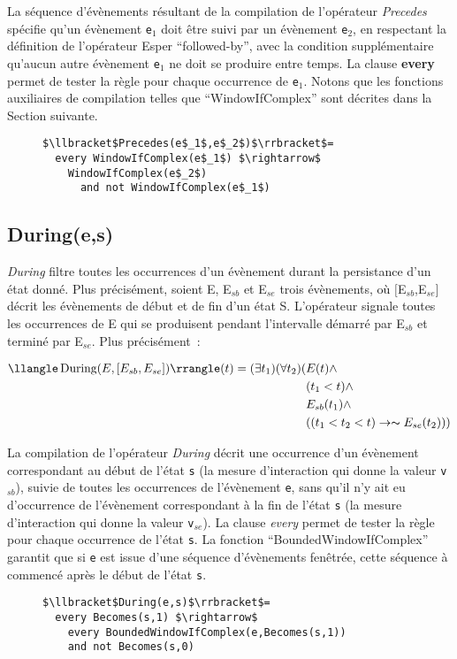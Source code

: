La séquence d'évènements résultant de la compilation de l'opérateur {\em Precedes} spécifie qu'un évènement {\tt e$_1$} doit être suivi par un évènement {\tt e$_2$}, en respectant la définition de l'opérateur Esper ``followed-by'', avec la condition supplémentaire qu'aucun autre évènement {\tt e$_1$} ne doit se produire entre temps. La clause {\bf every} permet de tester la règle pour chaque occurrence de {\tt e$_1$}. Notons que les fonctions auxiliaires de compilation telles que ``WindowIfComplex'' sont décrites dans la Section suivante.
\begin{figure}
\begin{lstlisting}[language=EPLPseudoCodeCompile]
$\llbracket$Precedes(e$_1$,e$_2$)$\rrbracket$=
  every WindowIfComplex(e$_1$) $\rightarrow$ 
    WindowIfComplex(e$_2$) 
      and not WindowIfComplex(e$_1$) 
\end{lstlisting}
\end{figure}

\subsection*{During(e,s)}
{\em During} filtre toutes les occurrences d'un évènement durant la persistance d'un état donné. Plus précisément, soient E, E$_{sb}$ et E$_{se}$ trois évènements, où $[$E$_{sb}$,E$_{se}]$ décrit les évènements de début et de fin d'un état S. L'opérateur signale toutes les occurrences de E qui se produisent pendant l'intervalle démarré par E$_{sb}$ et terminé par E$_{se}$. Plus précisément~:
\begin{small}
\begin{equation*}
\begin{split}
\llangle\operatorname{During}(E,[E_{sb},E_{se}])\rrangle(t)=(\exists t_1)(\forall t_2)(&E(t)\wedge   \\
&(t_1<t)\wedge\\
&E_{sb}(t_1)\wedge\\
&((t_1<t_2< t)\rightarrow \thicksim E_{se}(t_2)))
\end{split}
\end{equation*}
\end{small}

La compilation de l'opérateur {\em During} décrit une occurrence d'un évènement correspondant au début de l'état {\tt s} (\ie la mesure d'interaction qui donne la valeur {\tt v$_{sb}$}), suivie de toutes les occurrences de l'évènement {\tt e}, sans qu'il n'y ait eu d'occurrence de l'évènement correspondant à la fin de l'état {\tt s} (\ie la mesure d'interaction qui donne la valeur {\tt v$_{se}$}). La clause {\em every} permet de tester la règle pour chaque occurrence de l'état {\tt s}. La fonction ``BoundedWindowIfComplex'' garantit que si {\tt e} est issue d'une séquence d'évènements fenêtrée, cette séquence à commencé après le début de l'état {\tt s}.
\begin{figure}
\begin{lstlisting}[language=EPLPseudoCodeCompile]
$\llbracket$During(e,s)$\rrbracket$=
  every Becomes(s,1) $\rightarrow$ 
    every BoundedWindowIfComplex(e,Becomes(s,1)) 
    and not Becomes(s,0)
\end{lstlisting}
\end{figure}


